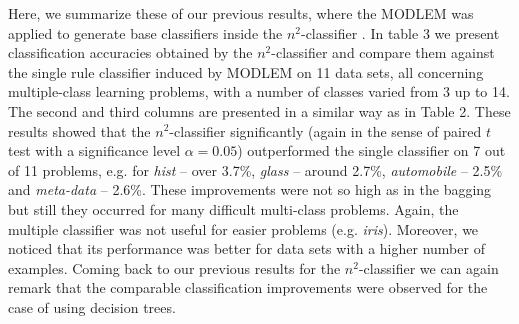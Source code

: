 \documentclass{llncs}
\begin{document}
Here, we summarize these of our previous results, where the MODLEM was
applied to generate base classifiers inside the $n^2$-classifier
\cite{Uppsala}. In table 3 we present classification accuracies obtained by
the $n^2$-classifier and compare them against the single rule classifier
induced by MODLEM on 11 data sets, all concerning multiple-class learning
problems, with a number of classes varied from 3 up to 14.  The second and
third columns are presented in a similar way as in Table 2. These results
showed that the $n^2$-classifier significantly (again in the sense of paired
$t$ test with a significance level $\alpha=0.05$) outperformed the single
classifier on 7 out of 11 problems, e.g. for {\em hist} -- over 3.7\%, {\em
glass} -- around 2.7\%, {\em automobile} -- 2.5\% and {\em meta-data} --
2.6\%. These improvements were not so high as in the bagging but still they
occurred for many difficult multi-class problems. Again, the multiple
classifier was not useful for easier problems (e.g. \emph{iris}). Moreover,
we noticed that its performance was better for data sets with a higher
number of examples. Coming back to our previous results for the
$n^2$-classifier \cite{JelStef98} we can again remark that the comparable
classification improvements were observed for the case of using decision
trees.
\end{document}
